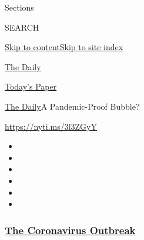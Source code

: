 Sections

SEARCH

\protect\hyperlink{site-content}{Skip to
content}\protect\hyperlink{site-index}{Skip to site index}

\href{https://www.nytimes3xbfgragh.onion/podcasts/the-daily}{The Daily}

\href{https://myaccount.nytimes3xbfgragh.onion/auth/login?response_type=cookie\&client_id=vi}{}

\href{https://www.nytimes3xbfgragh.onion/section/todayspaper}{Today's
Paper}

\href{/podcasts/the-daily}{The Daily}\textbar{}A Pandemic-Proof Bubble?

\url{https://nyti.ms/3l3ZGyY}

\begin{itemize}
\item
\item
\item
\item
\item
\item
\end{itemize}

\hypertarget{the-coronavirus-outbreak}{%
\subsubsection{\texorpdfstring{\href{https://www.nytimes3xbfgragh.onion/news-event/coronavirus?name=styln-coronavirus-national\&region=TOP_BANNER\&block=storyline_menu_recirc\&action=click\&pgtype=Article\&impression_id=5999b780-f1f1-11ea-a350-cdd0ea8242e6\&variant=undefined}{The
Coronavirus
Outbreak}}{The Coronavirus Outbreak}}\label{the-coronavirus-outbreak}}

